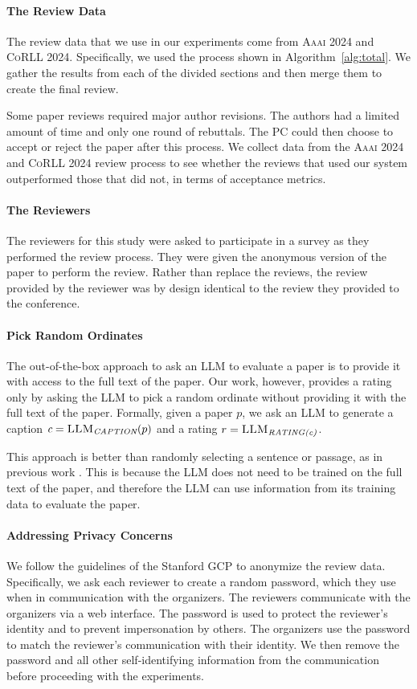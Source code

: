 \begin{minipage}[t]{\linewidth}
\paragraph{The Review Data}
    The review data that we use in our experiments come from \textsc{Aaai 2024} and \textsc{CoRLL 2024}. Specifically, we used the process shown in Algorithm~\ref{alg:total}.
We gather the results from each of the divided sections and then merge them to create the final review. 

Some paper reviews required major author revisions. The authors had a limited amount of time and only one round of rebuttals. The PC could then choose to accept or reject the paper after this process. We collect data from the \textsc{Aaai 2024} and \textsc{CoRLL 2024} review process to see whether the reviews that used our system outperformed those that did not, in terms of acceptance metrics.
\paragraph{The Reviewers}
    The reviewers for this study were asked to participate in a survey as they performed the review process. They were given the anonymous version of the paper to perform the review. Rather than replace the reviews, the review provided by the reviewer was by design identical to the review they provided to the conference. 
    \paragraph{Pick Random Ordinates}
    \label{par:pick-random-ordinals}
    The out-of-the-box approach to ask an LLM to evaluate a paper is to provide it with access to the full text of the paper. Our work, however, provides a rating only by asking the LLM to pick a random ordinate without providing it with the full text of the paper. Formally, given a paper $p$, we ask an LLM to generate a caption $\textit{c}=\textsc{LLM}_\textit{CAPTION}(p)$ and a rating $r=\textsc{LLM}_\textit{RATING(c)}$.

    This approach is better than randomly selecting a sentence or passage, as in previous work \cite{liu2023reviewergpt}. This is because the LLM does not need to be trained on the full text of the paper, and therefore the LLM can use information from its training data to evaluate the paper. 
    \paragraph{Addressing Privacy Concerns}
    We follow the guidelines of the Stanford GCP to anonymize the review data. Specifically, we ask each reviewer to create a random password, which they use when in communication with the organizers. The reviewers communicate with the organizers via a web interface. The password is used to protect the reviewer's identity and to prevent impersonation by others. The organizers use the password to match the reviewer's communication with their identity. We then remove the password and all other self-identifying information from the communication before proceeding with the experiments.


\end{minipage}

